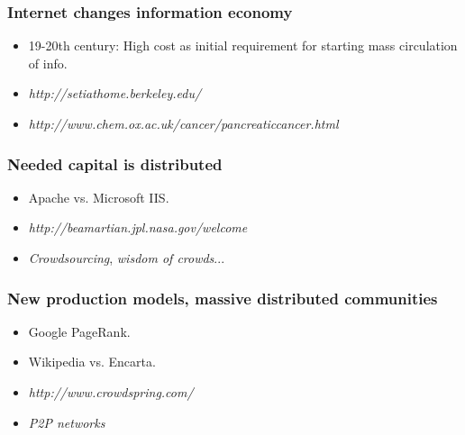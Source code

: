 \documentclass{beamer}
\begin{document}

\begin{frame}
 \frametitle{Internet changes information economy}
 \begin{itemize}
  \item 19-20th century: High cost as initial requirement for starting mass circulation of info.
  \item \textit{http://setiathome.berkeley.edu/}
  \item \textit{http://www.chem.ox.ac.uk/cancer/pancreaticcancer.html}
 \end{itemize}


\end{frame}


\begin{frame}
 \frametitle{Needed capital is distributed}
 \begin{itemize}
  \item Apache vs. Microsoft IIS.
  \item \textit{http://beamartian.jpl.nasa.gov/welcome}
  \item \textit{Crowdsourcing}, \textit{wisdom of crowds}...
 \end{itemize}

\end{frame}


\begin{frame}
 \frametitle{New production models, massive distributed communities}
 \begin{itemize}
  \item Google PageRank.
  \item Wikipedia vs. Encarta.
  \item \textit{http://www.crowdspring.com/}
  \item \textit{P2P networks}
 \end{itemize}

\end{frame}
\end{document}
